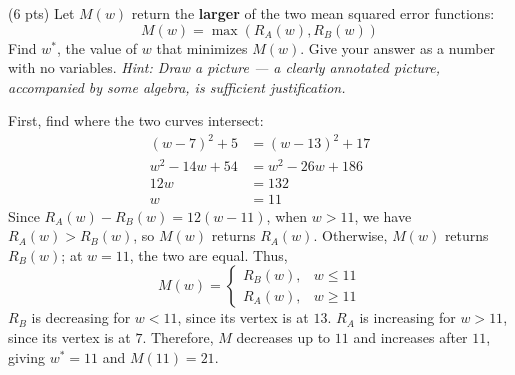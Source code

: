 \documentclass[11pt,twoside]{article}
\begin{document}
\begin{prob}[(12 pts)]
\newpage
\begin{subprob}(6 pts) Let $M(w)$ return the \textbf{larger} of the two mean squared error functions:
$$
M(w)=\max(R_A(w),R_B(w))
$$
Find $w^*$, the value of $w$ that minimizes $M(w)$. Give your answer as a number with no variables. \textit{Hint: Draw a picture --- a clearly annotated picture, accompanied by some algebra, is sufficient justification.}
\par\medskip

\begin{solution}
First, find where the two curves intersect:
\begin{align*}
(w-7)^2+5&=(w-13)^2+17\\
w^2-14w+54&=w^2-26w+186\\
12w&=132\\
w&=11
\end{align*}
Since $R_A(w)-R_B(w)=12(w-11)$, when $w>11$, we have $R_A(w)>R_B(w)$, so $M(w)$ returns $R_A(w)$. Otherwise, $M(w)$ returns $R_B(w)$; at $w=11$, the two are equal. Thus,
\[
M(w)=\begin{cases}
R_B(w),&w\leq11\\
R_A(w),&w\geq11
\end{cases}
\]
$R_B$ is decreasing for $w<11$, since its vertex is at $13$. $R_A$ is increasing for $w>11$, since its vertex is at $7$. Therefore, $M$ decreases up to $11$ and increases after $11$, giving $\boxed{w^*=11}$ and $M(11)=21$.
\begin{center}
\end{center}
\end{solution}
\end{subprob}
\endgroup\end{prob}\clearpage
\end{document}

